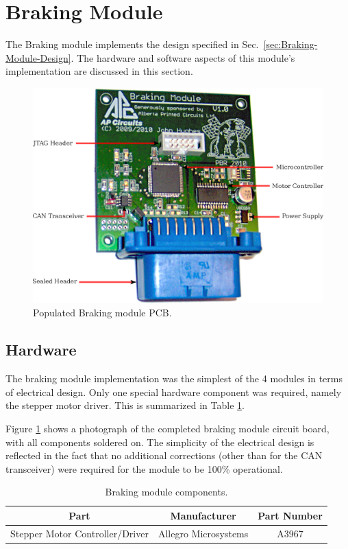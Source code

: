 \section{Braking Module}

The Braking module implements the design specified in Sec.\ \ref{sec:Braking-Module-Design}. The hardware and software aspects of this module's implementation are discussed in this section.

\begin{figure}[h]
\centering
\includegraphics[scale=1]{implementation/figures/braking_pcb}
\caption{Populated Braking module PCB.}
\label{fig:braking_pcb}
\end{figure}

\subsection{Hardware}

The braking module implementation was the simplest of the 4 modules in terms of electrical design. Only one special hardware component was required, namely the stepper motor driver. This is summarized in Table \ref{table:braking_module_components}.

Figure \ref{fig:braking_pcb} shows a photograph of the completed braking module circuit board, with all components soldered on. The simplicity of the electrical design is reflected in the fact that no additional corrections (other than for the CAN transceiver) were required for the module to be 100\% operational.

\begin{table}
  \caption{Braking module components.\label{table:braking_module_components}}
  \centering
  \begin{tabular}{|c|c|c|}
    \hline 
    Part & Manufacturer & Part Number\tabularnewline 
    \hline \hline
    Stepper Motor Controller/Driver & Allegro Microsystems & A3967 \tabularnewline
    \hline
  \end{tabular}
\end{table}

